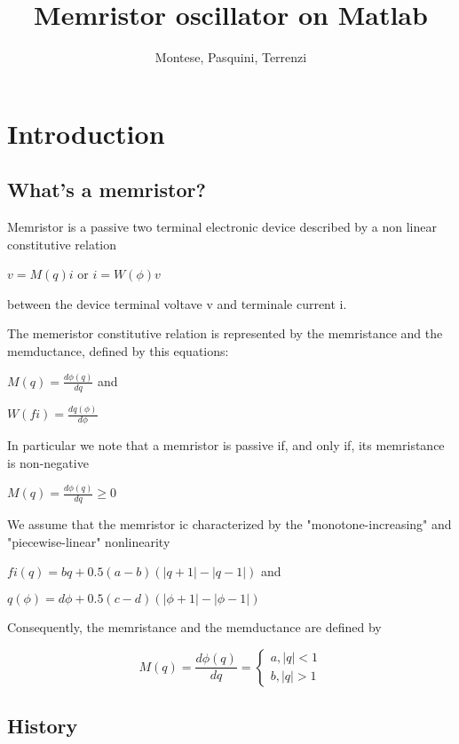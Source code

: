 \documentclass[12pt, a4paper]{book}
\begin{document}
\author{Montese, Pasquini, Terrenzi}

\title{Memristor oscillator on Matlab}
\maketitle

\section{Introduction}
\subsection{What's a memristor?}


Memristor is a passive two terminal electronic device described by a non linear
constitutive relation

                     $v=M(q)i$ or $i=W(\phi)v$

 between the device terminal voltave v and 
terminale current i.

The memeristor constitutive relation is represented by the memristance and the
memductance, defined by this equations: 

$M(q) = \frac{d\phi(q)}{dq} $ and

$ W(fi)=\frac{dq(\phi)}{d\phi}$

In particular we note that a memristor is passive if, and only if, its 
memristance is non-negative 

$M(q)=\frac{d\phi(q)}{dq}\geq 0$

We assume that the memristor ic characterized by the "monotone-increasing" and
"piecewise-linear" nonlinearity 

$fi(q)=bq+0.5(a-b)(|q+1|-|q-1|)$ and 

$q(\phi)=d\phi+0.5(c-d)(|\phi+1|-|\phi-1|)$

 Consequently, the memristance and the memductance are defined by 
 
\begin{equation}
M(q)=\frac{d\phi(q)}{dq}=
\begin{cases}
a, |q|<1
\\
b, |q|>1
\end{cases}
\end{equation}

\subsection{History}
\end{document}
